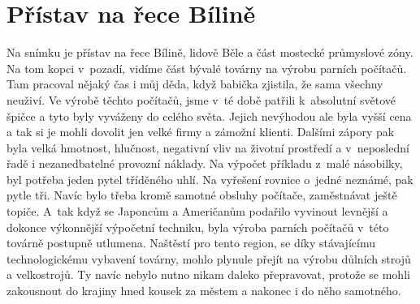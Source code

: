 
\chapter{Přístav na řece Bílině}

Na snímku je přístav na řece Bílině, lidově Běle a část mostecké
průmyslové zóny. Na tom kopci v~pozadí, vidíme část bývalé továrny na
výrobu parních počítačů. Tam pracoval nějaký čas i můj děda, když
babička zjistila, že sama všechny neuživí. Ve výrobě těchto počítačů,
jsme v~té době patřili k~absolutní světové špičce a tyto byly vyváženy
do celého světa. Jejich nevýhodou ale byla vyšší cena a tak si je
mohli dovolit jen velké firmy a zámožní klienti. Dalšími zápory
pak byla velká hmotnost, hlučnost, negativní vliv na životní
prostředí a v~neposlední řadě i nezanedbatelné provozní náklady.
Na výpočet příkladu z~malé násobilky, byl potřeba jeden pytel
tříděného uhlí. Na vyřešení rovnice o~jedné neznámé, pak pytle
tři. Navíc bylo třeba kromě samotné obsluhy počítače, zaměstnávat
ještě topiče. A~tak když se Japoncům a Američanům podařilo
vyvinout levnější a dokonce výkonnější výpočetní techniku, byla
výroba parních počítačů v~této továrně postupně utlumena. Naštěstí
pro tento region, se díky stávajícímu technologickému vybavení
továrny, mohlo plynule přejít na výrobu důlních strojů a
velkostrojů. Ty navíc nebylo nutno nikam daleko přepravovat,
protože se mohli zakousnout do krajiny hned kousek za městem a
nakonec i do něho samotného.
